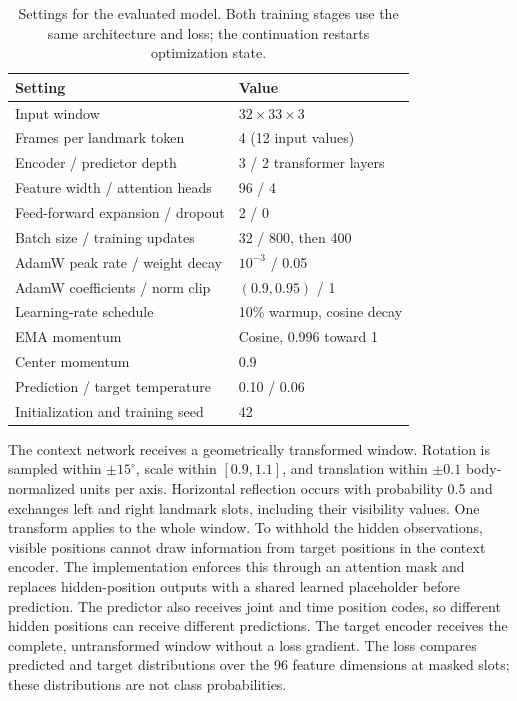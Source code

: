 \documentclass[10pt,twocolumn,letterpaper]{article}
\begin{document}
\begin{table}[t]
\centering
\caption{Settings for the evaluated model. Both training stages use the same architecture and loss; the continuation restarts optimization state.}
\label{tab:settings}
\small
\setlength{\tabcolsep}{4pt}
\begin{tabular}{p{}p{}}
\toprule
Setting & Value\\
\midrule
Input window & $32\times33\times3$\\
Frames per landmark token & 4 (12 input values)\\
Encoder / predictor depth & 3 / 2 transformer layers\\
Feature width / attention heads & 96 / 4\\
Feed-forward expansion / dropout & 2 / 0\\
Batch size / training updates & 32 / 800, then 400\\
AdamW peak rate / weight decay & $10^{-3}$ / 0.05\\
AdamW coefficients / norm clip & $(0.9,0.95)$ / 1\\
Learning-rate schedule & 10\% warmup, cosine decay\\
EMA momentum & Cosine, 0.996 toward 1\\
Center momentum & 0.9\\
Prediction / target temperature & 0.10 / 0.06\\
Initialization and training seed & 42\\
\bottomrule
\end{tabular}
\end{table}

The context network receives a geometrically transformed window. Rotation is sampled within $\pm15^\circ$, scale within $[0.9,1.1]$, and translation within $\pm0.1$ body-normalized units per axis. Horizontal reflection occurs with probability 0.5 and exchanges left and right landmark slots, including their visibility values. One transform applies to the whole window. To withhold the hidden observations, visible positions cannot draw information from target positions in the context encoder. The implementation enforces this through an attention mask and replaces hidden-position outputs with a shared learned placeholder before prediction. The predictor also receives joint and time position codes, so different hidden positions can receive different predictions. The target encoder receives the complete, untransformed window without a loss gradient. The loss compares predicted and target distributions over the 96 feature dimensions at masked slots; these distributions are not class probabilities.
\end{document}
